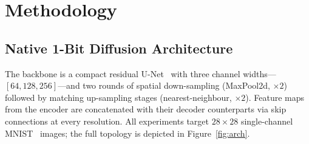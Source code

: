 \documentclass[conference]{IEEEtran}
\begin{document}
\section{Methodology}

\subsection{Native 1-Bit Diffusion Architecture}

The backbone is a compact residual U-Net~\cite{ronneberger2015unet} with three channel
widths---$[64, 128, 256]$---and two rounds of spatial down-sampling (MaxPool2d,
$\times2$) followed by matching up-sampling stages (nearest-neighbour, $\times2$).
Feature maps from the encoder are concatenated with their decoder counterparts via skip
connections at every resolution. All experiments target $28{\times}28$ single-channel
MNIST~\cite{lecun1998mnist} images; the full topology is depicted in
Figure~\ref{fig:arch}.
\end{document}
